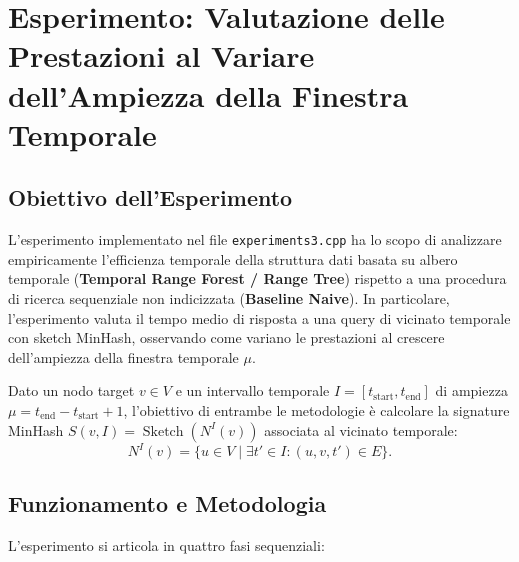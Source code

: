\section{Esperimento: Valutazione delle Prestazioni al Variare dell'Ampiezza della Finestra Temporale}
\label{sec:esperimento_variazione_mu}

\subsection{Obiettivo dell'Esperimento}
L'esperimento implementato nel file \texttt{experiments3.cpp} ha lo scopo di analizzare empiricamente l'efficienza temporale della struttura dati basata su albero temporale (\textbf{Temporal Range Forest / Range Tree}) rispetto a una procedura di ricerca sequenziale non indicizzata (\textbf{Baseline Naive}).
In particolare, l'esperimento valuta il tempo medio di risposta a una query di vicinato temporale con sketch MinHash, osservando come variano le prestazioni al crescere dell'ampiezza della finestra temporale $\mu$.

Dato un nodo target $v \in V$ e un intervallo temporale $I = [t_{\text{start}}, t_{\text{end}}]$ di ampiezza $\mu = t_{\text{end}} - t_{\text{start}} + 1$, l'obiettivo di entrambe le metodologie è calcolare la signature MinHash $S(v, I) = \operatorname{Sketch}(N^I(v))$ associata al vicinato temporale:
\[
N^I(v) = \{ u \in V \mid \exists t' \in I : (u, v, t') \in E \}.
\]

\subsection{Funzionamento e Metodologia}
L'esperimento si articola in quattro fasi sequenziali:


